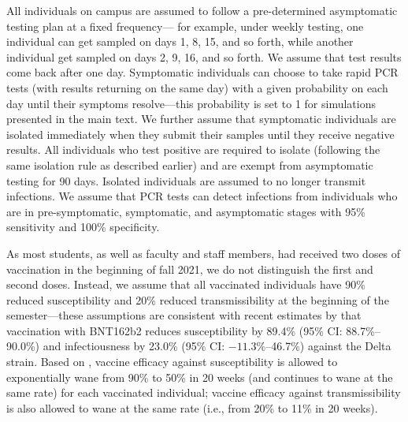 \documentclass[12pt]{article}
\begin{document}
All individuals on campus are assumed to follow a pre-determined asymptomatic testing plan at a fixed frequency---
for example, under weekly testing, one individual can get sampled on days 1, 8, 15, and so forth, while another individual get sampled on days 2, 9, 16, and so forth.
We assume that test results come back after one day.
Symptomatic individuals can choose to take rapid PCR tests (with results returning on the same day) with a given probability on each day until their symptoms resolve---this probability is set to 1 for simulations presented in the main text.
We further assume that symptomatic individuals are isolated immediately when they submit their samples until they receive negative results.
All individuals who test positive are required to isolate (following the same isolation rule as described earlier) and are exempt from asymptomatic testing for 90 days.
Isolated individuals are assumed to no longer transmit infections.
We assume that PCR tests can detect infections from individuals who are in pre-symptomatic, symptomatic, and asymptomatic stages with 95\% sensitivity and 100\% specificity.

As most students, as well as faculty and staff members, had received two doses of vaccination in the beginning of fall 2021, we do not distinguish the first and second doses.
Instead, we assume that all vaccinated individuals have 90\% reduced susceptibility and 20\% reduced transmissibility at the beginning of the semester---these assumptions are consistent with recent estimates by \cite{prunas2022vaccination} that vaccination with BNT162b2 reduces susceptibility by 89.4\% (95\% CI: 88.7\%--90.0\%) and infectiousness by 23.0\% (95\% CI: $-11.3\%$--46.7\%) against the Delta strain.
Based on \cite{tartof2021effectiveness}, vaccine efficacy against susceptibility is allowed to exponentially wane from 90\% to 50\% in 20 weeks (and continues to wane at the same rate) for each vaccinated individual;
vaccine efficacy against transmissibility is also allowed to wane at the same rate (i.e., from 20\% to 11\% in 20 weeks).
\end{document}
